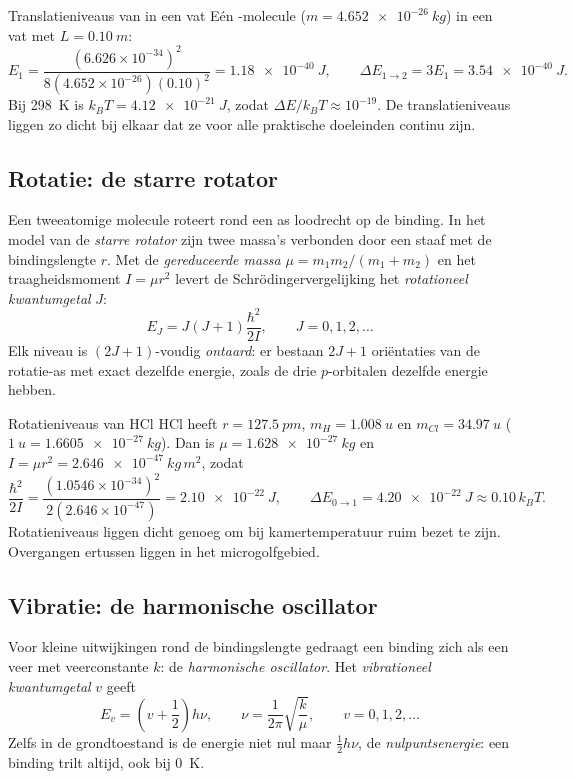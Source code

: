 \begin{voorbeeld}{Translatieniveaus van  in een vat}
Eén -molecule ($m=\SI{4.652e-26}{kg}$) in een vat met $L=\SI{0.10}{m}$:
\[
E_1 = \frac{(6.626\times10^{-34})^2}{8(4.652\times10^{-26})(0.10)^2} = \SI{1.18e-40}{J}, \qquad \Delta E_{1\to2} = 3E_1 = \SI{3.54e-40}{J}.
\]
Bij \SI{298}{K} is $k_BT = \SI{4.12e-21}{J}$, zodat $\Delta E/k_BT \approx 10^{-19}$. De translatieniveaus liggen zo dicht bij elkaar dat ze voor alle praktische doeleinden continu zijn.
\end{voorbeeld}

\subsection{Rotatie: de starre rotator}
\label{sec:rotatie}

Een tweeatomige molecule roteert rond een as loodrecht op de binding. In het model van de \emph{starre rotator} zijn twee massa's verbonden door een staaf met de bindingslengte $r$. Met de \emph{gereduceerde massa} $\mu = m_1 m_2/(m_1+m_2)$ en het traagheidsmoment $I = \mu r^2$ levert de Schr\"odingervergelijking het \emph{rotationeel kwantumgetal} $J$:
\begin{equation}
\boxed{
E_J = J(J+1)\frac{\hbar^2}{2I}, \qquad J=0,1,2,\ldots
}
\end{equation}
Elk niveau is $(2J+1)$-voudig \emph{ontaard}: er bestaan $2J+1$ oriëntaties van de rotatie-as met exact dezelfde energie, zoals de drie $p$-orbitalen dezelfde energie hebben.

\begin{voorbeeld}{Rotatieniveaus van HCl}
HCl heeft $r=\SI{127.5}{pm}$, $m_H=\SI{1.008}{u}$ en $m_{Cl}=\SI{34.97}{u}$ ($\SI{1}{u}=\SI{1.6605e-27}{kg}$). Dan is $\mu = \SI{1.628e-27}{kg}$ en $I = \mu r^2 = \SI{2.646e-47}{kg\,m^2}$, zodat
\[
\frac{\hbar^2}{2I} = \frac{(1.0546\times10^{-34})^2}{2(2.646\times10^{-47})} = \SI{2.10e-22}{J}, \qquad \Delta E_{0\to1} = \SI{4.20e-22}{J} \approx 0.10\,k_BT.
\]
Rotatieniveaus liggen dicht genoeg om bij kamertemperatuur ruim bezet te zijn. Overgangen ertussen liggen in het microgolfgebied.
\end{voorbeeld}

\subsection{Vibratie: de harmonische oscillator}
\label{sec:vibratie}

Voor kleine uitwijkingen rond de bindingslengte gedraagt een binding zich als een veer met veerconstante $k$: de \emph{harmonische oscillator}. Het \emph{vibrationeel kwantumgetal} $v$ geeft
\begin{equation}
\boxed{
E_v = \left(v+\frac{1}{2}\right)h\nu, \qquad \nu = \frac{1}{2\pi}\sqrt{\frac{k}{\mu}}, \qquad v=0,1,2,\ldots
}
\end{equation}
Zelfs in de grondtoestand is de energie niet nul maar $\tfrac{1}{2}h\nu$, de \emph{nulpuntsenergie}: een binding trilt altijd, ook bij \SI{0}{K}.

